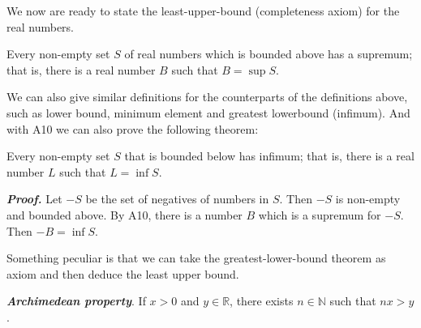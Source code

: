 \documentclass{report}
\begin{document}
    We now are ready to state the least-upper-bound (completeness axiom) for the real numbers.

    \begin{axBox}
        Every non-empty set $S$ of real numbers which is bounded above has a supremum; that is, there is a real number $B$ such that $B = \sup S$.
    \end{axBox}

    We can also give similar definitions for the counterparts of the definitions above, such as lower bound, minimum element and greatest lowerbound (infimum). And with A10 we can also prove the following theorem:

    \begin{thBox}
        Every non-empty set $S$ that is bounded below has infimum; that is, there is a real number $L$ such that $L = \inf S$.
    \end{thBox}
    \textit{\textbf{Proof.}} Let $-S$ be the set of negatives of numbers in $S$. Then $-S$ is non-empty and bounded above. By A10, there is a number $B$ which is a supremum for $-S$. Then $-B = \inf S$.

    Something peculiar is that we can take the greatest-lower-bound theorem as axiom and then deduce the least upper bound.

    \begin{thBox}
        \textit{\textbf{Archimedean property}}. If $x>0$ and $y \in \mathbb{R}$, there exists $n \in \mathbb{N}$ such that $nx>y$.
    \end{thBox}
\end{document}
